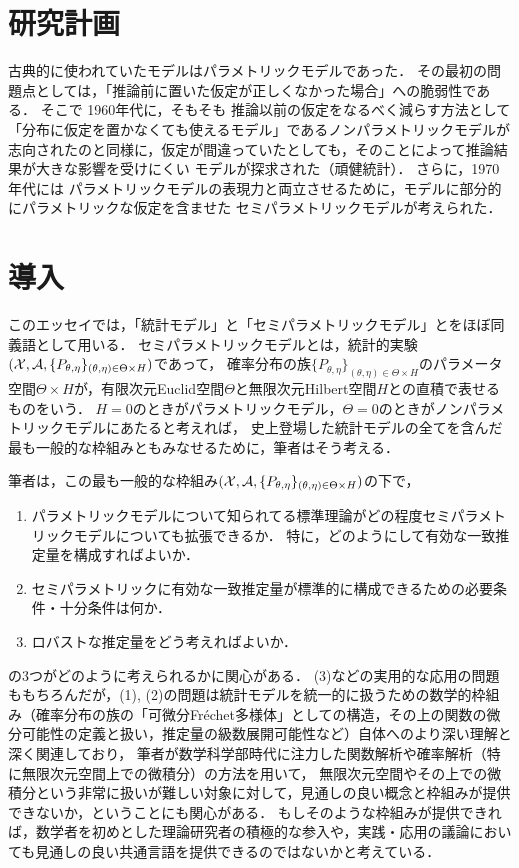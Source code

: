 \documentclass[uplatex, dvipdfmx]{jsarticle}
\begin{document}
\section*{研究計画}

古典的に使われていたモデルはパラメトリックモデルであった．
その最初の問題点としては，「推論前に置いた仮定が正しくなかった場合」への脆弱性である．
そこで
1960年代に，そもそも
推論以前の仮定をなるべく減らす方法として
「分布に仮定を置かなくても使えるモデル」であるノンパラメトリックモデルが志向されたのと同様に，仮定が間違っていたとしても，そのことによって推論結果が大きな影響を受けにくい
モデルが探求された（頑健統計）．
さらに，1970年代には
パラメトリックモデルの表現力と両立させるために，モデルに部分的にパラメトリックな仮定を含ませた
セミパラメトリックモデルが考えられた．



\tableofcontents

\section{導入}

このエッセイでは，「統計モデル」と「セミパラメトリックモデル」とをほぼ同義語として用いる．
セミパラメトリックモデルとは，統計的実験$(\mathcal{X},\mathcal{A},\{P_{\theta,\eta}\}_{(\theta,\eta)\in\Theta\times H})$であって，
確率分布の族$\{P_{\theta,\eta}\}_{(\theta,\eta)\in\Theta\times H}$のパラメータ空間$\Theta\times H$が，有限次元Euclid空間$\Theta$と無限次元Hilbert空間$H$との直積で表せるものをいう．
$H=0$のときがパラメトリックモデル，$\Theta=0$のときがノンパラメトリックモデルにあたると考えれば，
史上登場した統計モデルの全てを含んだ最も一般的な枠組みともみなせるために，筆者はそう考える．

筆者は，この最も一般的な枠組み$(\mathcal{X},\mathcal{A},\{P_{\theta,\eta}\}_{(\theta,\eta)\in\Theta\times H})$の下で，
\begin{enumerate}
    \item パラメトリックモデルについて知られてる標準理論がどの程度セミパラメトリックモデルについても拡張できるか．
    特に，どのようにして有効な一致推定量を構成すればよいか．
    \item セミパラメトリックに有効な一致推定量が標準的に構成できるための必要条件・十分条件は何か．
    \item ロバストな推定量をどう考えればよいか．
\end{enumerate}
の3つがどのように考えられるかに関心がある．
(3)などの実用的な応用の問題ももちろんだが，(1), (2)の問題は統計モデルを統一的に扱うための数学的枠組み（確率分布の族の「可微分Fréchet多様体」としての構造，その上の関数の微分可能性の定義と扱い，推定量の級数展開可能性など）自体へのより深い理解と深く関連しており，
筆者が数学科学部時代に注力した関数解析や確率解析（特に無限次元空間上での微積分）の方法を用いて，
無限次元空間やその上での微積分という非常に扱いが難しい対象に対して，見通しの良い概念と枠組みが提供できないか，ということにも関心がある．
もしそのような枠組みが提供できれば，数学者を初めとした理論研究者の積極的な参入や，実践・応用の議論においても見通しの良い共通言語を提供できるのではないかと考えている．
\end{document}
